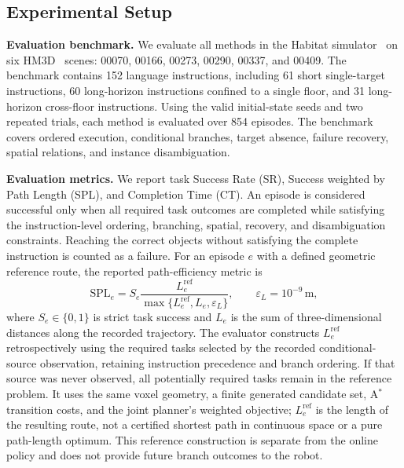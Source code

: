 \documentclass[letterpaper,10pt,journal]{IEEEtran}
\begin{document}
\subsection{Experimental Setup}
\textbf{Evaluation benchmark.}
We evaluate all methods in the Habitat simulator~\cite{savva2019habitat} on six HM3D~\cite{ramakrishnan2021hm3d} scenes: 00070, 00166, 00273, 00290, 00337, and 00409. The benchmark contains 152 language instructions, including 61 short single-target instructions, 60 long-horizon instructions confined to a single floor, and 31 long-horizon cross-floor instructions. Using the valid initial-state seeds and two repeated trials, each method is evaluated over 854 episodes. The benchmark covers ordered execution, conditional branches, target absence, failure recovery, spatial relations, and instance disambiguation.

\textbf{Evaluation metrics.}
We report task Success Rate (SR), Success weighted by Path Length (SPL), and Completion Time (CT). An episode is considered successful only when all required task outcomes are completed while satisfying the instruction-level ordering, branching, spatial, recovery, and disambiguation constraints. Reaching the correct objects without satisfying the complete instruction is counted as a failure. For an episode $e$ with a defined geometric reference route, the reported path-efficiency metric is
\begin{equation}
\mathrm{SPL}_e=S_e\frac{L_e^{\mathrm{ref}}}
{\max\{L_e^{\mathrm{ref}},L_e,\varepsilon_L\}},
\qquad \varepsilon_L=10^{-9}\,\mathrm m,
\label{eq:task-spl}
\end{equation}
where $S_e\in\{0,1\}$ is strict task success and $L_e$ is the sum of three-dimensional distances along the recorded trajectory. The evaluator constructs $L_e^{\mathrm{ref}}$ retrospectively using the required tasks selected by the recorded conditional-source observation, retaining instruction precedence and branch ordering. If that source was never observed, all potentially required tasks remain in the reference problem. It uses the same voxel geometry, a finite generated candidate set, A$^*$ transition costs, and the joint planner's weighted objective; $L_e^{\mathrm{ref}}$ is the length of the resulting route, not a certified shortest path in continuous space or a pure path-length optimum. This reference construction is separate from the online policy and does not provide future branch outcomes to the robot.
\end{document}
